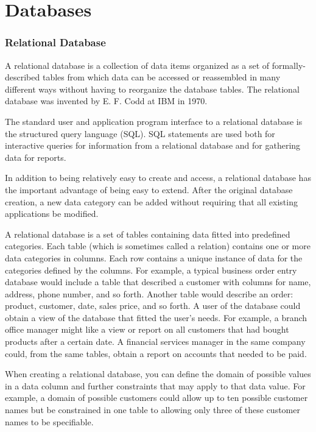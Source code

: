 

\chapter{Databases}
\subsection{Relational Database}
A relational database is a collection of data items organized as a set of formally-described tables from which data can be accessed or reassembled in many different ways without having to reorganize the database tables. The relational database was invented by E. F. Codd at IBM in 1970.

The standard user and application program interface to a relational database is the structured query language (SQL). SQL statements are used both for interactive queries for information from a relational database and for gathering data for reports.

In addition to being relatively easy to create and access, a relational database has the important advantage of being easy to extend. After the original database creation, a new data category can be added without requiring that all existing applications be modified.

A relational database is a set of tables containing data fitted into predefined categories. Each table (which is sometimes called a relation) contains one or more data categories in columns. Each row contains a unique instance of data for the categories defined by the columns. For example, a typical business order entry database would include a table that described a customer with columns for name, address, phone number, and so forth. Another table would describe an order: product, customer, date, sales price, and so forth. A user of the database could obtain a view of the database that fitted the user's needs. For example, a branch office manager might like a view or report on all customers that had bought products after a certain date. A financial services manager in the same company could, from the same tables, obtain a report on accounts that needed to be paid.

When creating a relational database, you can define the domain of possible values in a data column and further constraints that may apply to that data value. For example, a domain of possible customers could allow up to ten possible customer names but be constrained in one table to allowing only three of these customer names to be specifiable.


